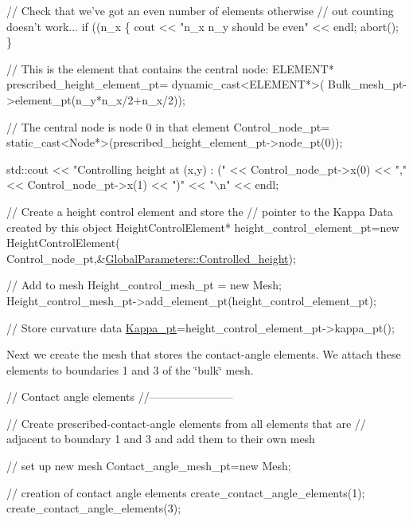 \begin{DoxyCodeInclude}

 \textcolor{comment}{// Check that we've got an even number of elements otherwise}
 \textcolor{comment}{// out counting doesn't work...}
 \textcolor{keywordflow}{if} ((n\_x%
  \{
   cout << \textcolor{stringliteral}{"n\_x n\_y should be even"} << endl;
   abort();
  \}
  
 \textcolor{comment}{//  This is the element that contains the central node:}
 ELEMENT* prescribed\_height\_element\_pt= \textcolor{keyword}{dynamic\_cast<}ELEMENT*\textcolor{keyword}{>}(
  Bulk\_mesh\_pt->element\_pt(n\_y*n\_x/2+n\_x/2));
 
 \textcolor{comment}{// The central node is node 0 in that element}
 Control\_node\_pt= \textcolor{keyword}{static\_cast<}Node*\textcolor{keyword}{>}(prescribed\_height\_element\_pt->node\_pt(0));

 std::cout << \textcolor{stringliteral}{"Controlling height at (x,y) : ("} << Control\_node\_pt->x(0) 
           << \textcolor{stringliteral}{","} << Control\_node\_pt->x(1)  << \textcolor{stringliteral}{")"} << \textcolor{stringliteral}{"\(\backslash\)n"} << endl;

 \textcolor{comment}{// Create a height control element and store the}
 \textcolor{comment}{// pointer to the Kappa Data created by this object}
 HeightControlElement* height\_control\_element\_pt=\textcolor{keyword}{new} HeightControlElement(
  Control\_node\_pt,&\hyperlink{namespaceGlobalParameters_a3731f24a02ce4f306d65a9a488f85c96}{GlobalParameters::Controlled\_height});
 
 \textcolor{comment}{// Add to mesh}
 Height\_control\_mesh\_pt = \textcolor{keyword}{new} Mesh;
 Height\_control\_mesh\_pt->add\_element\_pt(height\_control\_element\_pt);

 \textcolor{comment}{// Store curvature data}
 \hyperlink{namespaceGlobalParameters_ac6234184cce40ab2c6bec92b37e4ae41}{Kappa\_pt}=height\_control\_element\_pt->kappa\_pt();

\end{DoxyCodeInclude}


Next we create the mesh that stores the contact-\/angle elements. We attach these elements to boundaries 1 and 3 of the \char`\"{}bulk\char`\"{} mesh.


\begin{DoxyCodeInclude}


 \textcolor{comment}{// Contact angle elements}
 \textcolor{comment}{//-----------------------}

 \textcolor{comment}{// Create prescribed-contact-angle elements from all elements that are }
 \textcolor{comment}{// adjacent to boundary 1 and 3 and add them to their own mesh}

 \textcolor{comment}{// set up new mesh}
 Contact\_angle\_mesh\_pt=\textcolor{keyword}{new} Mesh;
 
 \textcolor{comment}{// creation of contact angle elements}
 create\_contact\_angle\_elements(1);
 create\_contact\_angle\_elements(3);

\end{DoxyCodeInclude}


